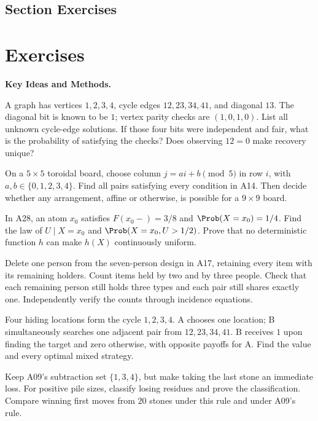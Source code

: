 

\par{}
\subsection*{Section Exercises}



\section{Exercises}
\noindent\textbf{Key Ideas and Methods.}\enspace



A graph has vertices $1,2,3,4$, cycle edges $12,23,34,41$, and diagonal $13$. The diagonal bit is known to be $1$; vertex parity checks are $(1,0,1,0)$. List all unknown cycle-edge solutions. If those four bits were independent and fair, what is the probability of satisfying the checks? Does observing $12=0$ make recovery unique?

On a $5\times5$ toroidal board, choose column $j=ai+b\pmod5$ in row $i$, with $a,b\in\{0,1,2,3,4\}$. Find all pairs satisfying every condition in A14. Then decide whether any arrangement, affine or otherwise, is possible for a $9\times9$ board.

In A28, an atom $x_0$ satisfies $F(x_0-)=3/8$ and $\Prob(X=x_0)=1/4$. Find the law of $U\mid X=x_0$ and $\Prob(X=x_0,U>1/2)$. Prove that no deterministic function $h$ can make $h(X)$ continuously uniform.

\pagebreak
{}
Delete one person from the seven-person design in A17, retaining every item with its remaining holders. Count items held by two and by three people. Check that each remaining person still holds three types and each pair still shares exactly one. Independently verify the counts through incidence equations.

Four hiding locations form the cycle $1,2,3,4$. A chooses one location; B simultaneously searches one adjacent pair from $12,23,34,41$. B receives $1$ upon finding the target and zero otherwise, with opposite payoffs for A. Find the value and every optimal mixed strategy.

Keep A09's subtraction set $\{1,3,4\}$, but make taking the last stone an immediate loss. For positive pile sizes, classify losing residues and prove the classification. Compare winning first moves from $20$ stones under this rule and under A09's rule.

